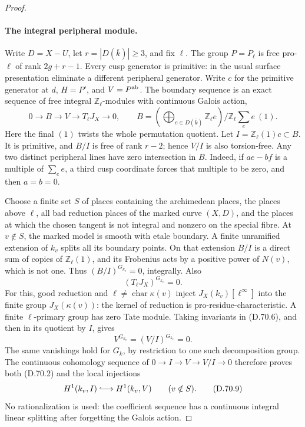 \begin{proof}
\paragraph{The integral peripheral module.}
Write \(D=X-U\), let \(r=|D(\bar k)|\ge3\), and fix \(\ell\).
The group \(P=P_\ell\) is free pro-\(\ell\) of rank \(2g+r-1\).
Every cusp generator is primitive: in the usual surface
presentation eliminate a different peripheral generator.
Write \(c\) for the primitive generator at \(d\), \(H=P'\),
and \(V=P^{\rm ab}\). The boundary sequence is an exact
sequence of free integral \(\mathbb Z_\ell\)-modules
with continuous Galois action,
\[
 0\longrightarrow B
   \longrightarrow V\longrightarrow T_\ell J_X
   \longrightarrow0,\qquad
 B=\left(\bigoplus_{e\in D(\bar k)}\mathbb Z_\ell e\right)
                         \Big/\mathbb Z_\ell\sum_e e\ (1).
                                                        \tag{D.70.6}
\]
Here the final \((1)\) twists the whole permutation quotient.
Let \(I=\mathbb Z_\ell(1)c\subset B\). It is primitive, and
\(B/I\) is free of rank \(r-2\); hence \(V/I\) is also
torsion-free. Any two distinct peripheral lines have zero
intersection in \(B\). Indeed, if \(a e-b f\) is a multiple
of \(\sum_e e\), a third cusp coordinate forces that multiple
to be zero, and then \(a=b=0\).

Choose a finite set \(S\) of places containing the archimedean
places, the places above \(\ell\), all bad reduction places of
the marked curve \((X,D)\), and the places at which the chosen
tangent is not integral and nonzero on the special fibre.
At \(v\notin S\), the marked model is smooth with etale
boundary. A finite unramified extension of \(k_v\) splits
all its boundary points. On that extension \(B/I\) is a
direct sum of copies of \(\mathbb Z_\ell(1)\), and its
Frobenius acts by a positive power of \(N(v)\), which is
not one. Thus \((B/I)^{G_{k_v}}=0\), integrally.
Also
\[
                  (T_\ell J_X)^{G_{k_v}}=0.             \tag{D.70.7}
\]
For this, good reduction and \(\ell\ne\operatorname{char}
\kappa(v)\) inject \(J_X(k_v)[\ell^\infty]\) into the
finite group \(J_X(\kappa(v))\): the kernel of reduction
is pro-residue-characteristic. A finite \(\ell\)-primary
group has zero Tate module. Taking invariants in (D.70.6),
and then in its quotient by \(I\), gives
\[
 V^{G_{k_v}}=(V/I)^{G_{k_v}}=0.
                                                        \tag{D.70.8}
\]
The same vanishings hold for \(G_k\), by restriction to
one such decomposition group. The continuous cohomology
sequence of \(0\to I\to V\to V/I\to0\) therefore proves
both (D.70.2) and the local injections
\[
 H^1(k_v,I)\lhook\joinrel\longrightarrow H^1(k_v,V)
                    \qquad(v\notin S).                 \tag{D.70.9}
\]
No rationalization is used: the coefficient sequence
has a continuous integral linear splitting after
forgetting the Galois action.


\end{proof}
